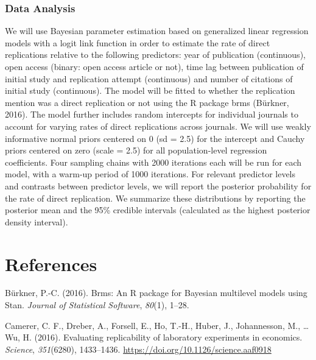 \documentclass[
  english,
  man]{apa6}
\begin{document}
\hypertarget{data-analysis-1}{%
\subsubsection{Data Analysis}\label{data-analysis-1}}

We will use Bayesian parameter estimation based on generalized linear regression models with a logit link function in order to estimate the rate of direct replications relative to the following predictors:
year of publication (continuous), open access (binary: open access article or not), time lag between publication of initial study and replication attempt (continuous) and number of citations of initial study (continuous).
The model will be fitted to whether the replication mention was a direct replication or not using the R package brms (Bürkner, 2016).
The model further includes random intercepts for individual journals to account for varying rates of direct replications across journals.
We will use weakly informative normal priors centered on 0 (sd = 2.5) for the intercept and Cauchy priors centered on zero (scale = 2.5) for all population-level regression coefficients.
Four sampling chains with 2000 iterations each will be run for each model, with a warm-up period of 1000 iterations.
For relevant predictor levels and contrasts between predictor levels, we will report the posterior probability for the rate of direct replication.
We summarize these distributions by reporting the posterior mean and the 95\% credible intervals (calculated as the highest posterior density interval).
\newpage

\hypertarget{references}{%
\section{References}\label{references}}

\begingroup
\setlength{\parindent}{-0.5in}
\setlength{\leftskip}{0.5in}

\hypertarget{refs}{}
\leavevmode\hypertarget{ref-burkner_brms_2016}{}%
Bürkner, P.-C. (2016). Brms: An R package for Bayesian multilevel models using Stan. \emph{Journal of Statistical Software}, \emph{80}(1), 1--28.

\leavevmode\hypertarget{ref-camerer_economics_2016}{}%
Camerer, C. F., Dreber, A., Forsell, E., Ho, T.-H., Huber, J., Johannesson, M., \ldots{} Wu, H. (2016). Evaluating replicability of laboratory experiments in economics. \emph{Science}, \emph{351}(6280), 1433--1436. \url{https://doi.org/10.1126/science.aaf0918}
\end{document}
